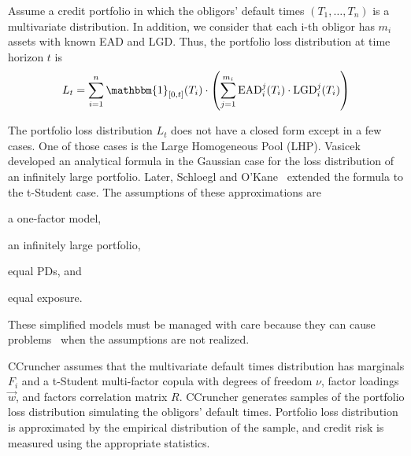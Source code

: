 \documentclass[11pt,fleqn]{book} %
\begin{document}
Assume a credit portfolio in which the obligors' default times 
$(T_1,\dots,T_n)$ is a multivariate distribution. In addition, we consider 
that each i-th obligor has $m_i$ assets with known EAD and LGD\@. Thus, 
the portfolio loss distribution at time horizon $t$ is
\begin{displaymath}
	L_t = \displaystyle \sum_{i=1}^n \mathbbm{1}_{[0,t]}(T_i) \cdot 
	\left( 
	\sum_{j=1}^{m_i} \text{EAD}_i^j(T_i) \cdot \text{LGD}_i^j(T_i)
	\right)
\end{displaymath}

The portfolio loss distribution $L_t$ does not have a closed form except 
in a few cases. One of those cases is the Large Homogeneous Pool (LHP).
Vasicek~\cite{vasicek:1987} developed an analytical formula in the Gaussian 
case for the loss distribution of an infinitely large portfolio. Later, 
Schloegl and O'Kane~\cite{schloegl:2005} extended the formula to the 
t-Student case. The assumptions of these approximations are 
\begin{inparaenum}[1)]
	\item a one-factor model, 
	\item an infinitely large portfolio, 
	\item equal PDs, and
	\item equal exposure.
\end{inparaenum}
These simplified models must be managed with care because they can cause 
problems~\cite{long:2012} when the assumptions are not realized.

CCruncher assumes that the multivariate default times distribution has
marginals $F_i$ and a t-Student multi-factor copula with degrees 
of freedom $\nu$, factor loadings $\vec{w}$, and factors correlation matrix 
$R$. CCruncher generates samples of the portfolio loss distribution simulating 
the obligors' default times. Portfolio loss distribution is approximated by the 
empirical distribution of the sample, and credit risk is measured using the 
appropriate statistics.
\end{document}
